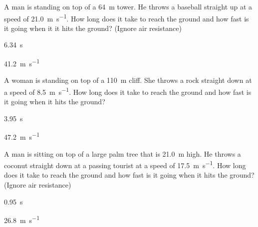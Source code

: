 

    

\begin{question}[ID=falling-A-Q01,topic=kinematics,difficulty=A]
    A man is standing on top of a \SI{64}{\meter} tower.
    He throws a baseball straight up at a speed of
        \SI{21.0}{\meter\per\second}.
    How long does it take to reach the ground and how fast
        is it going when it it hits the ground?
    (Ignore air resistance)
\end{question}
\begin{solution}
    \begin{enumerate*}
        \item \SI{6.34}{\second}
        \item \SI{41.2}{\meter\per\second}
    \end{enumerate*}
\end{solution}


\begin{question}[ID=falling-A-Q02,topic=kinematics,difficulty=A]
    A woman is standing on top of a \SI{110}{\meter} cliff.
    She throws a rock straight down at a speed of
        \SI{8.5}{\meter\per\second}.
    How long does it take to reach the ground and how fast
        is it going when it hits the ground?
\end{question}
\begin{solution}
    \begin{enumerate*}
        \item \SI{3.95}{\second}
        \item \SI{47.2}{\meter\per\second}
    \end{enumerate*}
\end{solution}


\begin{question}[ID=falling-A-Q03,topic=kinematics,difficulty=A]
    A man is sitting on top of a large palm tree that is
        \SI{21.0}{\meter} high.
    He throws a coconut straight down at a passing tourist
        at a speed of \SI{17.5}{\meter\per\second}.
    How long does it take to reach the ground and how fast
        is it going when it hits the ground?
    (Ignore air resistance)
\end{question}
\begin{solution}
    \begin{enumerate*}
        \item \SI{0.95}{\second}
        \item \SI{26.8}{\meter\per\second}
    \end{enumerate*}
\end{solution}

